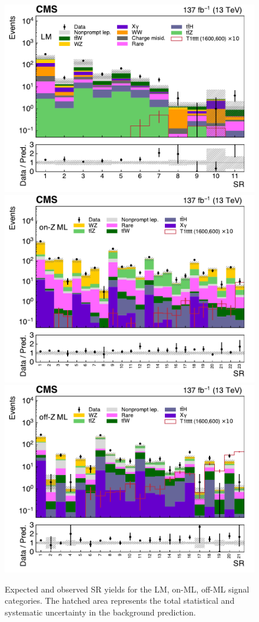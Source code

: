 \begin{figure}[!hbtp]
\centering
\includegraphics[width=.50\textwidth]{figs/ssp/SRLM_TOTAL.pdf}
\includegraphics[width=.50\textwidth]{figs/ssp/SRMLONZ_TOTAL.pdf}
\includegraphics[width=.50\textwidth]{figs/ssp/SRMLOFFZ_TOTAL.pdf}
\\
\caption{Expected and observed SR yields for the LM, on-\PZ ML, off-\PZ ML signal categories. 
The hatched area represents the total statistical and systematic uncertainty in the background prediction.
}
\label{fig:SRrun2b}
\end{figure}


